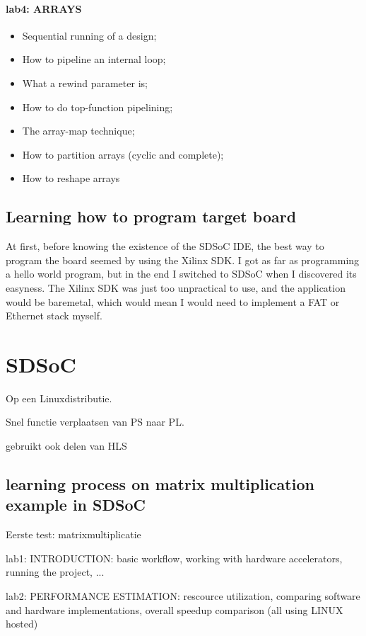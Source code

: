 \paragraph{lab4: ARRAYS}
\begin{itemize}
	\item Sequential running of a design;
	\item How to pipeline an internal loop;
	\item What a rewind parameter is;
	\item How to do top-function pipelining;
	\item The array-map technique;
	\item How to partition arrays (cyclic and complete);
	\item How to reshape arrays
\end{itemize}

\subsection{Learning how to program target board}

At first, before knowing the existence of the SDSoC IDE, the best way to program the board seemed by using the Xilinx SDK. I got as far as programming a hello world program, but in the end I switched to SDSoC when I discovered its easyness. The Xilinx SDK was just too unpractical to use, and the application would be baremetal, which would mean I would need to implement a FAT or Ethernet stack myself.

\section{SDSoC}

Op een Linuxdistributie.

Snel functie verplaatsen van PS naar PL.

gebruikt ook delen van HLS

\subsection{learning process on matrix multiplication example in SDSoC}

Eerste test: matrixmultiplicatie

lab1: INTRODUCTION: basic workflow, working with hardware accelerators, running the project, ...

lab2: PERFORMANCE ESTIMATION: rescource utilization, comparing software and hardware implementations, overall speedup comparison (all using LINUX hosted)

